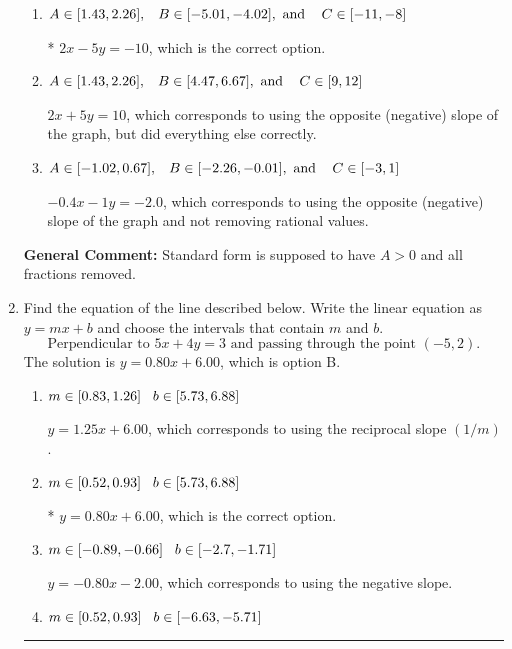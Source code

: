 \documentclass{extbook}[14pt]
\newcommand{\litem}[1]{\item #1

\rule{\textwidth}{0.4pt}}
\begin{document}
\begin{enumerate}
{\begin{enumerate}[label=\Alph*.]
 $-0.4x + 1y = 2.0$, which corresponds to not removing rational values for Standard Form.
\item \( A \in [1.43, 2.26], \hspace{3mm} B \in [-5.01, -4.02], \text{ and } \hspace{3mm} C \in [-11, -8] \)

* $2x - 5y = -10$, which is the correct option.
\item \( A \in [1.43, 2.26], \hspace{3mm} B \in [4.47, 6.67], \text{ and } \hspace{3mm} C \in [9, 12] \)

 $2x + 5y = 10$, which corresponds to using the opposite (negative) slope of the graph, but did everything else correctly.
\item \( A \in [-1.02, 0.67], \hspace{3mm} B \in [-2.26, -0.01], \text{ and } \hspace{3mm} C \in [-3, 1] \)

 $-0.4x - 1y = -2.0$, which corresponds to using the opposite (negative) slope of the graph and not removing rational values.
\end{enumerate}

\textbf{General Comment:} Standard form is supposed to have $A > 0$ and all fractions removed.
}
\litem{
Find the equation of the line described below. Write the linear equation as $ y=mx+b $ and choose the intervals that contain $m$ and $b$.
\[ \text{Perpendicular to } 5 x + 4 y = 3 \text{ and passing through the point } (-5, 2). \]The solution is \( y = 0.80x + 6.00 \), which is option B.\begin{enumerate}[label=\Alph*.]
\item \( m \in [0.83, 1.26] \hspace*{3mm} b \in [5.73, 6.88] \)

 $y = 1.25x + 6.00$, which corresponds to using the reciprocal slope $(1/m)$.
\item \( m \in [0.52, 0.93] \hspace*{3mm} b \in [5.73, 6.88] \)

* $y = 0.80x + 6.00$, which is the correct option.
\item \( m \in [-0.89, -0.66] \hspace*{3mm} b \in [-2.7, -1.71] \)

 $y = -0.80x - 2.00$, which corresponds to using the negative slope.
\item \( m \in [0.52, 0.93] \hspace*{3mm} b \in [-6.63, -5.71] \)


\end{enumerate}}
\end{enumerate}
\end{document}
